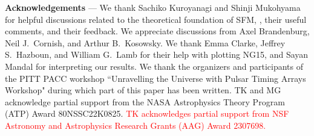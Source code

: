 \documentclass[prd,twocolumn,aps,psfig,nofootinbib,nobibnotes,superscriptaddress,preprintnumbers,times]{revtex4-2}
\def\red{\textcolor{red}}
\begin{document}
\vspace{2mm}
{\bf Acknowledgements} --- We thank Sachiko Kuroyanagi and Shinji Mukohyama for helpful discussions related to the theoretical foundation of SFM, \cite{Fujita:2018ehq}, their useful comments, and their feedback. We appreciate discussions from Axel Brandenburg, Neil J.\ Cornish, and Arthur B.\ Kosowsky. We thank Emma Clarke, Jeffrey S.\ Hazboun, and William G.\ Lamb for their help with plotting NG15, and Sayan Mandal for interpreting our results. We thank the organizers and participants of the PITT PACC workshop ``Unravelling the Universe with Pulsar Timing Arrays Workshop" during which part of this paper has been written. TK and MG acknowledge partial support from the NASA Astrophysics Theory Program (ATP) Award 80NSSC22K0825. \red{TK acknowledges partial support from NSF Astronomy and Astrophysics Research Grants (AAG) Award 2307698.}




\clearpage
\end{document}
